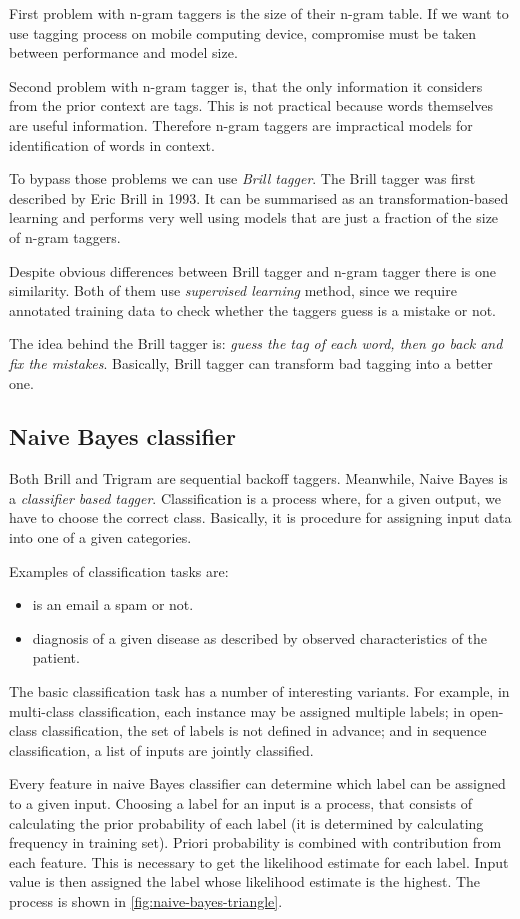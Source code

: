 \documentclass[10pt, conference, compsocconf]{IEEEtran}
\begin{document}
First problem with n-gram taggers is the size of their n-gram table. If we want to use tagging process on mobile computing device, compromise must be taken between performance and model size. 

Second problem with n-gram tagger is, that the only information it considers from the prior context are tags. This is not practical because words themselves are useful information. Therefore n-gram taggers are impractical models for identification of words in context. 
  
To bypass those problems we can use \textit{Brill tagger}. The Brill tagger was first described by Eric Brill in 1993. It can be summarised as an transformation-based learning and performs very well using models that are just a fraction of the size of n-gram taggers.

Despite obvious differences between Brill tagger and n-gram tagger there is one similarity. Both of them use \textit{supervised learning} method, since we require annotated training data to check whether the taggers guess is a mistake or not.

The idea behind the Brill tagger is: \textit{guess the tag of each word, then go back and fix the mistakes}. Basically, Brill tagger can transform bad tagging into a better one. 

\subsection{Naive Bayes classifier}
Both Brill and Trigram are sequential backoff taggers. Meanwhile, Naive Bayes is a \textit{classifier based tagger}.
Classification is a process where, for a given output, we have to choose the correct class. Basically, it is  procedure for assigning input data into one of a given categories.

Examples of classification tasks are:
\begin{itemize}
\item is an email a spam or not.
\item diagnosis of a given disease as described by observed characteristics of the patient.
\end{itemize}
The basic classification task has a number of interesting variants. For example, in multi-class classification, each instance may be assigned multiple labels; in open-class classification, the set of labels is not defined in advance; and in sequence classification, a list of inputs are jointly classified.

Every feature in naive Bayes classifier can determine which label can be assigned to a given input. Choosing a label for an input is a process, that consists of calculating the prior probability of each label (it is determined by calculating frequency in training set). Priori probability is combined with contribution from each feature. This is necessary to get the likelihood estimate for each label. Input value is then assigned the label whose likelihood estimate is the highest. The process is shown in \ref{fig:naive-bayes-triangle}.
\end{document}
